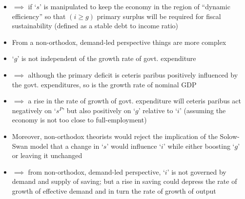 \documentclass{article}
\begin{document}
\begin{itemize}
	\item \( \implies \) if `\( s \)' is manipulated to keep the economy in the region of ``dynamic efficiency'' so that \( (i \geq g) \) primary surplus will be required for fiscal sustainability (defined as a stable debt to income ratio)
	\item From a non-orthodox, demand-led perspective things are more complex
	\item `\( g \)' is not independent of the growth rate of govt. expenditure
	\item \( \implies \) although the primary deficit is ceteris paribus positively influenced by the govt. expenditures, so is the growth rate of nominal GDP
	\item \( \implies \) a rise in the rate of growth of govt. expenditure will ceteris paribus act negatively on `\( s^P \)' but also positively on `\( g \)' relative to `\( i \)' (assuming the economy is not too close to full-employment)
	\item Moreover, non-orthodox theorists would reject the implication of the Solow-Swan model that a change in `\( s \)' would influence `\( i \)' while either boosting `\( g \)' or leaving it unchanged
	\item \( \implies \) from non-orthodox, demand-led perspective, `\( i \)' is not governed by demand and supply of saving; but a rise in saving could depress the rate of growth of effective demand and in turn the rate of growth of output
\end{itemize}
\end{document}
